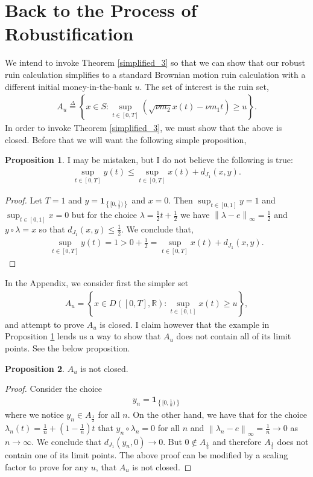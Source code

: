 \documentclass[12pt]{article}
\newcommand{\R}{\mathbb{R}}
\newcommand\norm[1]{\left\lVert#1\right\rVert}
\newcommand{\define}{\overset{\Delta}{=}}
\theoremstyle{definition}
\theoremstyle{definition}
\newtheorem{proposition}{Proposition}
\theoremstyle{definition}
\begin{document}
\section*{Back to the Process of Robustification}
We intend to invoke Theorem \ref{simplified_3} so that we can show that our robust ruin calculation simplifies to a standard Brownian motion ruin calculation with a different initial money-in-the-bank $u$. The set of interest is the ruin set,
\begin{align*}
A_u\define \left\{x\in S: \sup_{t\in[0,T]} \left(\sqrt{\nu m_2}x(t)-\nu m_1t\right)\geq u\right\}.
\end{align*}
In order to invoke Theorem \ref{simplified_3}, we must show that the above is closed. Before that we will want the following simple proposition,
\begin{proposition} \label{prop_counter_example} I may be mistaken, but I do not believe the following is true:
\begin{align*}
\sup_{t\in[0,T]}y(t)\leq \sup_{t\in[0,T]} x(t)+d_{J_1}(x,y).
\end{align*}
\end{proposition}
\begin{proof} Let $T=1$ and $y = \bm{1}_{\left\{[0,\frac{1}{2})\right\}}$ and $x=0$. Then $\sup_{t\in[0,1]} y=1$ and $\sup_{t\in[0,1]} x=0$ but for the choice $\lambda = \frac{1}{2}t+\frac{1}{2}$ we have $\norm{\lambda-e}_{\infty}=\frac{1}{2}$ and $y\circ \lambda = x$ so that $d_{J_1}(x,y)\leq \frac{1}{2}$. We conclude that,
\begin{align*}
\sup_{t\in[0,T]}y(t) = 1> 0+ \frac{1}{2} = \sup_{t\in[0,T]} x(t)+d_{J_1}(x,y).
\end{align*}
\end{proof}
In the Appendix, we consider first the simpler set 
\begin{align*}
A_u = \left\{x\in D\left([0,T],\R\right): \sup_{t\in[0,1]} x(t)\geq u\right\},
\end{align*}
and attempt to prove $A_u$ is closed. I claim however that the example in Proposition \ref{prop_counter_example} lends us a way to show that $A_u$ does not contain all of its limit points. See the below proposition.
\begin{proposition} $A_u$ is not closed.
\end{proposition}
\begin{proof} Consider the choice
\begin{align*}
y_n = \bm{1}_{\left\{[0,\frac{1}{n})\right\}}
\end{align*}
where we notice $y_n\in A_{\frac{1}{2}}$ for all $n$. On the other hand, we have that for the choice $\lambda_n(t) = \frac{1}{n}+(1-\frac{1}{n})t$ that $y_n\circ \lambda_n=0$ for all $n$ and $\norm{\lambda_n-e}_{\infty}=\frac{1}{n}\rightarrow 0 $ as $n\rightarrow \infty$. We conclude that $d_{J_1}(y_n,0)\rightarrow 0$. But $0\not\in A_{\frac{1}{2}}$ and therefore $A_\frac{1}{2}$ does not contain one of its limit points. The above proof can be modified by a scaling factor to prove for any $u$, that $A_u$ is not closed.
\end{proof}
\end{document}
